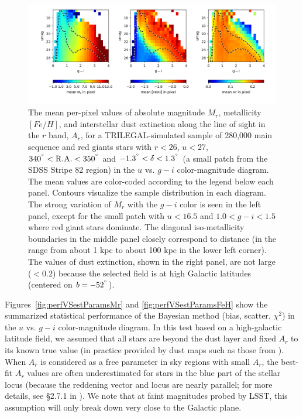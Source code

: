 \begin{figure}[ht!]
\hskip -0.3in
\includegraphics[width=1.08\textwidth,angle=0]{figures/qpBmeans_SDSSpatchRA340-350-simLSST_FeH.png}
\vskip -0.3in
\caption{The mean per-pixel values of absolute magnitude $M_r$, metallicity $[Fe/H]$, and interstellar dust extinction along the
  line of sight in the $r$ band, $A_r$, for a TRILEGAL-simulated sample of 280,000 main
  sequence and red giants stars with $r<26$, $u<27$, $340^{\degree} < {\rm R.A.} < 350^{\degree}$
  and $-1.3^{\degree} < \delta < 1.3^{\degree}$ (a small patch from the SDSS Stripe 82 region) in the $u$ vs. $g-i$
  color-magnitude diagram. The mean values are color-coded according to the legend below each panel. Contours
  visualize the sample distribution in each diagram. The strong variation of $M_r$ with the $g-i$ color is seen in the left panel,
  except for the small patch with $u<16.5$ and $1.0 < g-i < 1.5$ where red giant stars dominate. The
  diagonal iso-metallicity boundaries in the middle panel closely correspond to distance
  (in the range from about 1 kpc to about 100 kpc in the lower left corner). The values of
  dust extinction, shown in the right panel, are not large ($<0.2$) because the
  selected field is at high Galactic latitudes (centered on $b = -52^{\degree}$).}
\label{fig:qpBmeans}
\end{figure}

Figures~\ref{fig:perfVSestParamsMr} and \ref{fig:perfVSestParamsFeH} show the summarized statistical performance of the Bayesian
method (bias, scatter, $\chi^2$) in the $u$ vs. $g-i$ color-magnitude diagram. In this test based on a high-galactic
latitude field, we assumed that all stars are beyond the dust layer and fixed $A_r$ to its known true value (in practice provided by dust
maps such as those from \citealt{schlegel_maps_1998}). When $A_r$ is considered as a free parameter in sky regions with small $A_r$,
the best-fit $A_r$ values are often underestimated for stars in the blue part of the stellar locus (because the reddening vector and locus
are nearly parallel; for more details, see \S2.7.1 in \citealt{2012ApJ...757..166B}). We note that at faint magnitudes probed by LSST, this
assumption will only break down very close to the Galactic plane.


